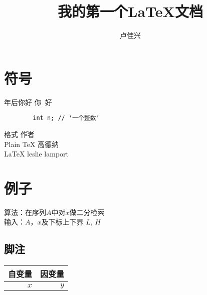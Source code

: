 \documentclass{ctexart}
\begin{document}
\title{我的第一个\LaTeX{}文档}
\author{卢佳兴}
\maketitle
    \section{符号}
    年后你好 \quad 你~好

    \lstset{language=C,flexiblecolumns,escapechar='} %
    \begin{lstlisting}
        int n; // '一个整数'
    \end{lstlisting}

    \begin{tabbing}
        格式\hspace{3em} \= 作者 \\
        Plain   \TeX \> 高德纳 \\
        \LaTeX  \> leslie lamport
    \end{tabbing}


    \section{例子}
    \begin{tabbing}
        算法：在序列$A$中对$x$做二分检索 \\
        输入：$A$，$x$及下标上下界 $L$, $H$ \\
    \end{tabbing}

    \subsection{脚注}
    \begin{tabular}{|r|r|}
        自变量 & 因变量\footnotemark \\ \hline
        $x$ & $y$
    \end{tabular}
\end{document}
